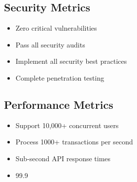 \documentclass{article}
\begin{document}
\subsection*{Security Metrics}
\begin{itemize}
    \item Zero critical vulnerabilities
    \item Pass all security audits
    \item Implement all security best practices
    \item Complete penetration testing
\end{itemize}

\subsection*{Performance Metrics}
\begin{itemize}
    \item Support 10,000+ concurrent users
    \item Process 1000+ transactions per second
    \item Sub-second API response times
    \item 99.9\\%
\end{itemize}
\end{document}
